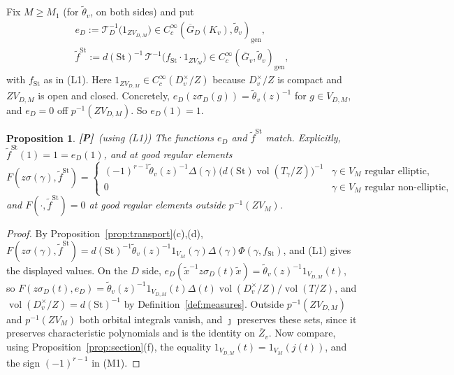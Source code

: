 \documentclass[12pt]{article}
\newcommand{\ov}[1]{\overline{#1}}
\newcommand{\gen}{\mathrm{gen}}
\newcommand{\vol}{\operatorname{vol}}
\newcommand{\St}{\mathrm{St}}
\newcommand{\Gb}{\ov{G}}
\newcommand{\Zb}{\ov{Z}}
\newcommand{\GDb}{\ov{G}_D}
\newcommand{\jj}{\jmath}
\newcommand{\sg}{\sigma}
\newcommand{\Pv}{\textbf{[P]}}
\theoremstyle{plain}
\newtheorem{proposition}[theorem]{Proposition}
\theoremstyle{definition}
\begin{document}
Fix $M\ge M_1$ (for $\tilde\theta_v$, on both sides) and put
\begin{gather*} e_D:=\mathcal T_D^{-1}\big(1_{ZV_{D,M}}\big)\in C_c^\infty(\GDb(K_v),\tilde\theta_v)_\gen,\\ \tilde f^{\St}:=d(\St)^{-1}\,\mathcal T^{-1}\big(f_{\St}\cdot1_{ZV_M}\big)\in C_c^\infty(\Gb_v,\tilde\theta_v)_\gen, \end{gather*}
with $f_{\St}$ as in (L1). Here $1_{ZV_{D,M}}\in C_c^\infty(D_v^\times/Z)$ because $D_v^\times/Z$ is compact and $ZV_{D,M}$ is open and closed. Concretely, $e_D(z\sg_D(g))=\tilde\theta_v(z)^{-1}$ for $g\in V_{D,M}$, and $e_D=0$ off $p^{-1}(ZV_{D,M})$. So $e_D(1)=1$.

\begin{proposition}\label{prop:eD}\Pv\ (using (L1))
The functions $e_D$ and $\tilde f^{\St}$ match. Explicitly, $\tilde f^{\St}(1)=1=e_D(1)$, and at good regular elements
\[ F(z\sg(\gamma),\tilde f^{\St})=\begin{cases}(-1)^{r-1}\tilde\theta_v(z)^{-1}\Delta(\gamma)\big(d(\St)\vol(T_\gamma/Z)\big)^{-1}&\gamma\in V_M\text{ regular elliptic},\\ 0&\gamma\in V_M\text{ regular non-elliptic},\end{cases} \]
and $F(\cdot,\tilde f^{\St})=0$ at good regular elements outside $p^{-1}(ZV_M)$.
\end{proposition}
\begin{proof}
By Proposition~\ref{prop:transport}(c),(d), $F(z\sg(\gamma),\tilde f^{\St})=d(\St)^{-1}\tilde\theta_v(z)^{-1}1_{V_M}(\gamma)\Delta(\gamma)\Phi(\gamma,f_{\St})$, and (L1) gives the displayed values. On the $D$ side, $e_D(\tilde x^{-1}z\sg_D(t)\tilde x)=\tilde\theta_v(z)^{-1}1_{V_{D,M}}(t)$, so $F(z\sg_D(t),e_D)=\tilde\theta_v(z)^{-1}1_{V_{D,M}}(t)\Delta(t)\vol(D_v^\times/Z)/\vol(T/Z)$, and $\vol(D_v^\times/Z)=d(\St)^{-1}$ by Definition~\ref{def:measures}. Outside $p^{-1}(ZV_{D,M})$ and $p^{-1}(ZV_M)$ both orbital integrals vanish, and $\jj$ preserves these sets, since it preserves characteristic polynomials and is the identity on $\Zb_v$. Now compare, using Proposition~\ref{prop:section}(f), the equality $1_{V_{D,M}}(t)=1_{V_M}(j(t))$, and the sign $(-1)^{r-1}$ in (M1).
\end{proof}
\end{document}
